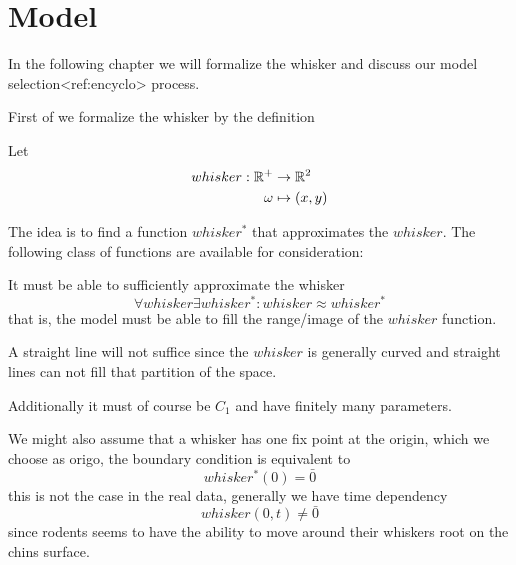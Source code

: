 \section{Model}


In the following chapter we will formalize the whisker and discuss our model
selection<ref:encyclo> process.

First of we formalize the whisker by the definition

\begin{definition}
    Let 
    \begin{equation}
    \begin{split}
        whisker : \mathbb{R}^+ &\rightarrow \mathbb{R}^2 \\
                  \omega&\mapsto (x,y)
    \end{split}
    \end{equation}
\end{definition}

The idea is to find a function $whisker^*$ that approximates the $whisker$. The 
following class of functions are available for consideration:

It must be able to sufficiently approximate the whisker
\begin{equation}
    \forall whisker \exists whisker^* : whisker \approx whisker^*
\end{equation}
that is, the model must be able to fill the range/image of the $whisker$ function.

\begin{example}
    A straight line will not suffice since the $whisker$ is generally
    curved and straight lines can not fill that partition of the space.
\end{example}

Additionally it must of course be $C_1$ and have finitely many parameters.

We might also assume that a whisker has one fix point at the origin, which we
choose as origo, the boundary condition is equivalent to
\begin{equation}
    \label{eq:bv_root}
    whisker^*(0)=\bar{0}
\end{equation}
this is not the case in the real data, generally we have time dependency
\begin{equation}
    whisker(0,t)\neq\bar{0} 
\end{equation}
since rodents seems to have the ability to move around their whiskers root on
the chins surface.

